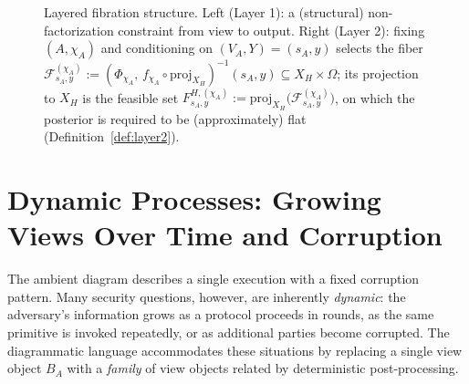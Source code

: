 \documentclass[11pt,a4paper]{article}
\theoremstyle{definition}
\theoremstyle{plain}
\newcommand{\cF}{\mathcal{F}}
\begin{document}
\begin{figure}[ht]
\centering
\begin{minipage}[t]{0.48\textwidth}
\centering
{}
\end{minipage}
\hfill
\begin{minipage}[t]{0.48\textwidth}
\centering
{}
\end{minipage}
\caption{Layered fibration structure. Left (Layer 1): a (structural) non-factorization constraint from view to output. Right (Layer 2): fixing $(A,\chi_A)$ and conditioning on $(V_A,Y)=(s_A,y)$ selects the fiber
$\cF^{(\chi_A)}_{s_A,y}:=(\Phi_{\chi_A},\, f_{\chi_A}\circ \mathrm{proj}_{X_H})^{-1}(s_A,y)\subseteq X_H\times\Omega$;
its projection to $X_H$ is the feasible set $F^{H,(\chi_A)}_{s_A,y}:=\mathrm{proj}_{X_H}\!\bigl(\cF^{(\chi_A)}_{s_A,y}\bigr)$, on which the posterior is required to be (approximately) flat (Definition~\ref{def:layer2}).}
\label{fig:layered-fibration}
\end{figure}

\section{Dynamic Processes: Growing Views Over Time and Corruption}
\label{sec:dynamic-processes}
The ambient diagram describes a single execution with a fixed corruption pattern.
Many security questions, however, are inherently \emph{dynamic}: the adversary's information grows as a protocol proceeds in rounds, as the same primitive is invoked repeatedly, or as additional parties become corrupted.
The diagrammatic language accommodates these situations by replacing a single view object $B_A$ with a \emph{family} of view objects related by deterministic post-processing.
\end{document}
